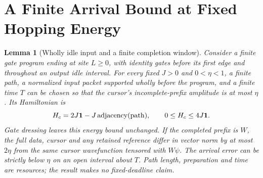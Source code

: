 \documentclass[12pt]{article}
\newtheorem{lemma}[theorem]{Lemma}
\theoremstyle{definition}
\theoremstyle{remark}
\begin{document}
\appendix
\section{A Finite Arrival Bound at Fixed Hopping Energy}\label{app:arrival}

\begin{lemma}[Wholly idle input and a finite completion window]
\label{lem:idlearrival}
Consider a finite gate program ending at site $L\ge0$, with identity
gates before its first edge and throughout an output idle interval.
For every fixed $J>0$ and $0<\eta<1$, a finite path, a normalized
input packet supported wholly before the program, and a finite time
$T$ can be chosen so that the cursor's incomplete-prefix amplitude
is at most $\eta$. Its Hamiltonian is
\[
 H_c=2J\mathbf1-J\operatorname{adjacency}({\rm path}),
 \qquad 0\le H_c\le4J\mathbf1.
\]
Gate dressing leaves this energy bound unchanged. If the completed
prefix is $W$, the full data, cursor and any retained reference differ
in vector norm by at most $2\eta$ from the same cursor wavefunction
tensored with $W\psi$. The arrival error can be strictly below $\eta$
on an open interval about $T$. Path length, preparation and time are
resources; the result makes no fixed-deadline claim.
\end{lemma}
\end{document}
